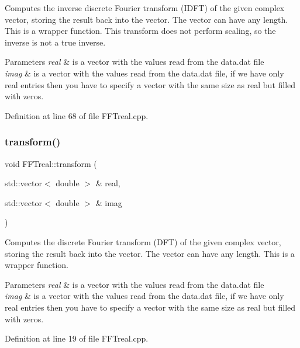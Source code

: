 Computes the inverse discrete Fourier transform (I\+D\+FT) of the given complex vector, storing the result back into the vector. The vector can have any length. This is a wrapper function. This transform does not perform scaling, so the inverse is not a true inverse. 


\begin{DoxyParams}{Parameters}
{\em real} & is a vector with the values read from the data.\+dat file \\
\hline
{\em imag} & is a vector with the values read from the data.\+dat file, if we have only real entries then you have to specify a vector with the same size as real but filled with zeros. \\
\hline
\end{DoxyParams}


Definition at line 68 of file F\+F\+Treal.\+cpp.

\mbox{\label{class_f_f_treal_a16caf75d31c313da4c6c1659497434c2}} 
\subsubsection{\texorpdfstring{transform()}{transform()}}
{\footnotesize\ttfamily void F\+F\+Treal\+::transform (\begin{DoxyParamCaption}\item[{std\+::vector$<$ double $>$ \&}]{real,  }\item[{std\+::vector$<$ double $>$ \&}]{imag }\end{DoxyParamCaption})}



Computes the discrete Fourier transform (D\+FT) of the given complex vector, storing the result back into the vector. The vector can have any length. This is a wrapper function. 


\begin{DoxyParams}{Parameters}
{\em real} & is a vector with the values read from the data.\+dat file \\
\hline
{\em imag} & is a vector with the values read from the data.\+dat file, if we have only real entries then you have to specify a vector with the same size as real but filled with zeros. \\
\hline
\end{DoxyParams}


Definition at line 19 of file F\+F\+Treal.\+cpp.


